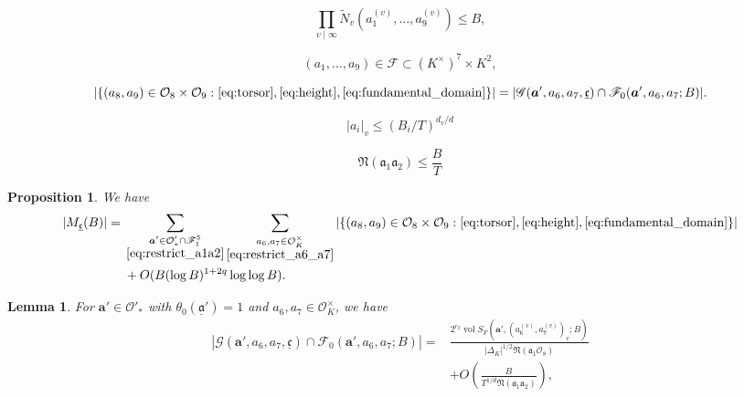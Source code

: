 \documentclass[10pt,a4paper]{amsart}
\newtheorem{prop}{Proposition}
\newtheorem{lemma}{Lemma}
\newcommand{\Fs}{\mathscr{F}}
\newcommand{\Gs}{\mathscr{G}}
\newcommand\N{\mathfrak{N}}
\newcommand\Nt{\widetilde{N}}
\newcommand{\OK}{\Os_K}
\newcommand{\Os}{\mathcal{O}}
\newcommand\ab{\boldsymbol{a}}
\newcommand\afr{{\mathfrak{a}}}
\newcommand\afrb{{\underline{\mathfrak{a}}}}
\newcommand\cfrb{{\underline{\mathfrak{c}}}}
\newcommand\sums[1]{\sum_{\substack{#1}}}
\DeclareMathOperator{\vol}{vol}
\begin{document}
    \begin{equation}\label{eq:height}
        \prod_{v \mid \infty} \Nt_v(a_1^{(v)},\dots,a_9^{(v)})\le B,
    \end{equation}

    \begin{equation}\label{eq:fundamental_domain}
        (a_1,\dots,a_9) \in \Fs \subset (K^\times)^7 \times K^2,
    \end{equation}

\begin{equation}\label{eq:lattice_points}
    |\{(a_8,a_9) \in \Os_8 \times \Os_9 : \eqref{eq:torsor}, \eqref{eq:height}, \eqref{eq:fundamental_domain}\}| = |\Gs(\ab',a_6,a_7,\cfrb) \cap \Fs_0(\ab',a_6,a_7;B)|.
\end{equation}

\begin{equation}\label{eq:restrict_a6_a7}
    |a_i|_v \le (B_i/T)^{d_v/d}
\end{equation}

\begin{equation}\label{eq:restrict_a1a2}
    \N(\afr_1\afr_2) \le \frac{B}{T}
\end{equation}

\begin{prop}\label{prop:restrict_a6_a7}
    We have
    \begin{align*}
        |M_\cfrb(B)| ={}&\sums{\ab' \in \Os'_* \cap \Fs_1^5\\ \eqref{eq:restrict_a1a2}} \sums{a_6,a_7 \in \OK^\times\\\eqref{eq:restrict_a6_a7}} |\{(a_8,a_9) \in \Os_8 \times \Os_9 : \eqref{eq:torsor}, \eqref{eq:height}, \eqref{eq:fundamental_domain}\}|\\
        &+ O(B(\log B)^{1+2q}\log\log B).
    \end{align*}
\end{prop}

\begin{lemma}\label{lem:lattice_points}
    For $\ab' \in \Os'_*$ with $\theta_0(\afrb')=1$ and $a_6,a_7 \in \OK^\times$, we have
    \begin{align*}
        |\Gs(\ab',a_6,a_7,\cfrb) \cap \Fs_0(\ab',a_6,a_7;B)| ={}& \frac{2^{r_2}\vol S_F(\ab',(a_6^{(v)},a_7^{(v)})_v;B)}{|\Delta_K|^{1/2}\N(\afr_1\Os_8)}\\ &+ O\left(\frac{B}{T^{1/d}\N(\afr_1\afr_2)}\right),
    \end{align*}
\end{lemma}
\end{document}
